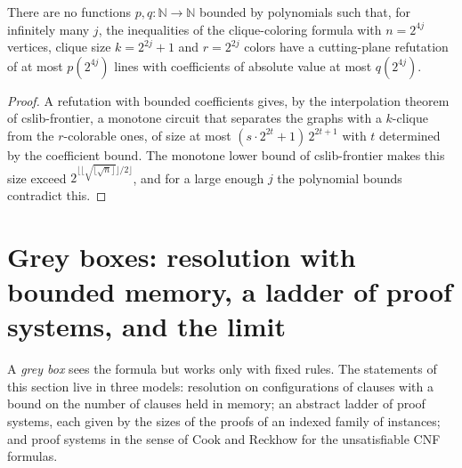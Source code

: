 \begin{theorem}
  \label{thm:structure-sin-refutacion-polinomial}
  \leanok
  There are no functions $p, q : \mathbb{N} \to \mathbb{N}$ bounded by polynomials such that, for
  infinitely many $j$, the inequalities of the clique-coloring formula with $n = 2^{4j}$ vertices,
  clique size $k = 2^{2j} + 1$ and $r = 2^{2j}$ colors have a cutting-plane refutation of at most
  $p(2^{4j})$ lines with coefficients of absolute value at most $q(2^{4j})$.
\end{theorem}

\begin{proof}
  \leanok
  A refutation with bounded coefficients gives, by the interpolation theorem of cslib-frontier, a
  monotone circuit that separates the graphs with a $k$-clique from the $r$-colorable ones, of size
  at most $(s \cdot 2^{2t} + 1)\, 2^{2t+1}$ with $t$ determined by the coefficient bound. The monotone
  lower bound of cslib-frontier makes this size exceed $2^{\lfloor \lfloor \sqrt{\lfloor \sqrt n
  \rfloor} \rfloor / 2 \rfloor}$, and for a large enough $j$ the polynomial bounds contradict this.
\end{proof}

\section{Grey boxes: resolution with bounded memory, a ladder of proof systems, and the limit}
\label{sec:structure-grey}

A \emph{grey box} sees the formula but works only with fixed rules. The statements of this section
live in three models: resolution on configurations of clauses with a bound on the number of clauses
held in memory; an abstract ladder of proof systems, each given by the sizes of the proofs of an
indexed family of instances; and proof systems in the sense of Cook and Reckhow for the
unsatisfiable CNF formulas.

